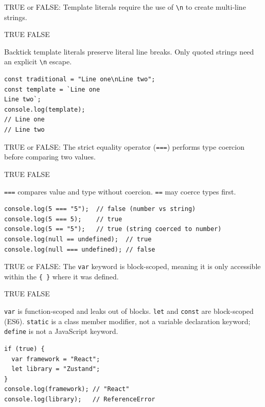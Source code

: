 
\question[4]
TRUE or FALSE: Template literals require the use of \lstinline[style=jsinline]|\n| to create multi-line strings.
\begin{choices}
  \choice TRUE
  \CorrectChoice FALSE
\end{choices}
\begin{solution}
  Backtick template literals preserve literal line breaks. Only quoted strings need an explicit \lstinline[style=jsinline]|\n| escape.
\begin{lstlisting}[style=js]
const traditional = "Line one\nLine two";
const template = `Line one
Line two`;
console.log(template);
// Line one
// Line two
\end{lstlisting}
\end{solution}

\question[4]
TRUE or FALSE: The strict equality operator (\lstinline[style=jsinline]|===|) performs type coercion before comparing two values.
\begin{choices}
  \choice TRUE
  \CorrectChoice FALSE
\end{choices}
\begin{solution}
  \lstinline[style=jsinline]|===| compares value and type without coercion. \lstinline[style=jsinline]|==| may coerce types first.
\begin{lstlisting}[style=js]
console.log(5 === "5");  // false (number vs string)
console.log(5 === 5);    // true
console.log(5 == "5");   // true (string coerced to number)
console.log(null == undefined);  // true
console.log(null === undefined); // false
\end{lstlisting}
\end{solution}

\question[4]
TRUE or FALSE: The \lstinline[style=jsinline]|var| keyword is block-scoped, meaning it is only accessible within the \lstinline[style=jsinline]|{ }| where it was defined.
\begin{choices}
  \choice TRUE
  \CorrectChoice FALSE
\end{choices}
\begin{solution}
  \lstinline[style=jsinline]|var| is function-scoped and leaks out of blocks. \lstinline[style=jsinline]|let| and \lstinline[style=jsinline]|const| are block-scoped (ES6). \lstinline[style=jsinline]|static| is a class member modifier, not a variable declaration keyword; \lstinline[style=jsinline]|define| is not a JavaScript keyword.
\begin{lstlisting}[style=js]
if (true) {
  var framework = "React";
  let library = "Zustand";
}
console.log(framework); // "React"
console.log(library);   // ReferenceError
\end{lstlisting}
\end{solution}

